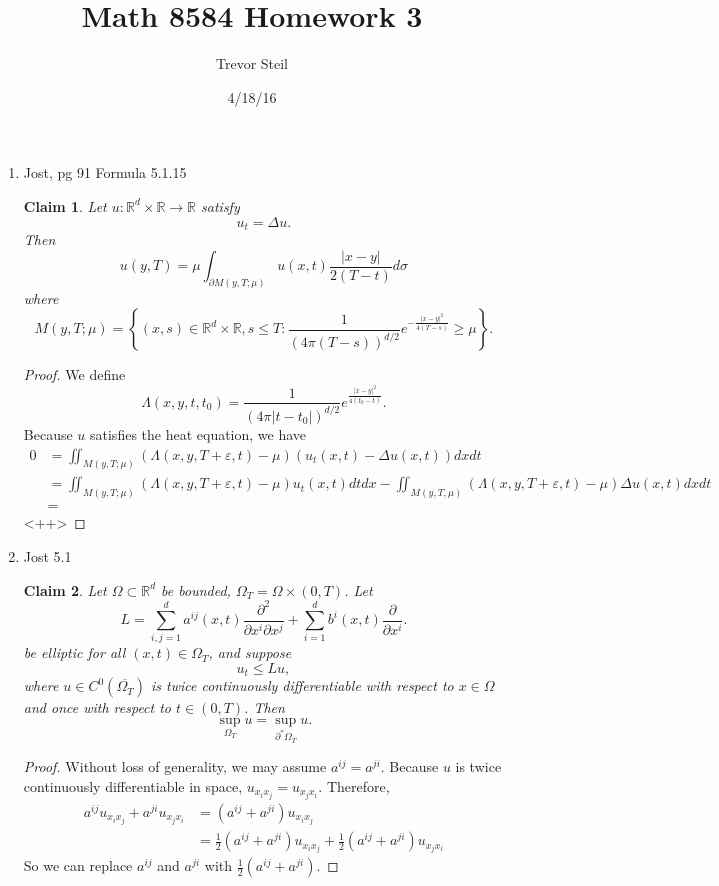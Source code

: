 \documentclass[a4paper]{article}
\title{Math 8584 Homework 3 }
\date{4/18/16}
\author{Trevor Steil}
\newtheorem*{claim}{Claim}
\newcommand{\R}{\mathbb{R}}
\begin{document}
\maketitle
\begin{enumerate}
  \item Jost, pg 91 Formula 5.1.15
    \begin{claim}
      Let $u: \R^d \times \R \to \R$ satisfy
      \begin{equation*}
        u_t = \Delta u.
      \end{equation*}
      Then
      \[ u(y,T) = \mu \int_{\partial M(y, T; \mu)}^{} u(x,t) \frac{|x-y|}{2(T-t)} d \sigma \]
      where
      \[ M(y,T; \mu) = \left\{ (x,s) \in \R^d \times \R, s \leq T : \frac{1}{(4 \pi (T-s))^{d/2}} e^{-\frac{|x-y|^2}{4(T-s)} } \geq \mu \right\} .\]
    \end{claim}

    \begin{proof}
      We define
      \[ \Lambda(x,y,t,t_0) = \frac{1}{(4 \pi |t-t_0|)^{d/2}} e^{\frac{|x-y|^2}{4(t_0 - t)} } .\]
      Because $u$ satisfies the heat equation, we have
      \begin{align*}
        0 &= \iint_{M(y,T;\mu)}^{} ( \Lambda(x,y,T+\varepsilon,t) - \mu) (u_t (x,t) - \Delta u(x,t)) dx dt \\
        &= \iint_{M(y,T;\mu)}^{} ( \Lambda(x,y,T+\varepsilon,t) - \mu ) u_t(x,t) dt dx
        - \iint_{M(y,T,\mu)}^{} ( \Lambda(x,y,T+\varepsilon,t) - \mu ) \Delta u(x,t) dx dt \\
        &=
      \end{align*}<++>
    \end{proof}

  \item Jost 5.1
    \begin{claim}
      Let $\Omega \subset \R^d$ be bounded, $\Omega_T = \Omega \times (0,T)$. Let
      \[ L = \sum_{i,j=1}^d a^{ij}(x,t) \frac{\partial^2}{\partial x^i \partial x^j} + \sum_{i=1}^d b^i(x,t) \frac{\partial}{\partial x^i} .\]
      be elliptic for all $(x,t) \in \Omega_T$, and suppose
      \[ u_t \leq Lu, \]
      where $u \in C^0(\overline{\Omega_T})$ is twice continuously differentiable with respect to $x \in \Omega$ and once with respect to $t \in
      (0,T)$. Then
      \[ \sup_{\Omega_T} u = \sup_{\partial^\ast \Omega_T} u. \]
    \end{claim}

    \begin{proof}
      Without loss of generality, we may assume $a^{ij} = a^{ji}$. Because $u$ is twice continuously differentiable in space, $u_{x_i x_j} = u_{x_j
      x_i}$. Therefore,
      \begin{align*}
        a^{ij} u_{x_i x_j} + a^{ji} u_{x_j x_i} &= (a^{ij} + a^{ji}) u_{x_i x_j} \\
        &= \frac{1}{2} (a^{ij} + a^{ji}) u_{x_i x_j} + \frac{1}{2} (a^{ij} + a^{ji}) u_{x_j x_i}
      \end{align*}
      So we can replace $a^{ij}$ and $a^{ji}$ with $\frac{1}{2} (a^{ij} + a^{ji})$.


\end{proof}
\end{enumerate}
\end{document}
